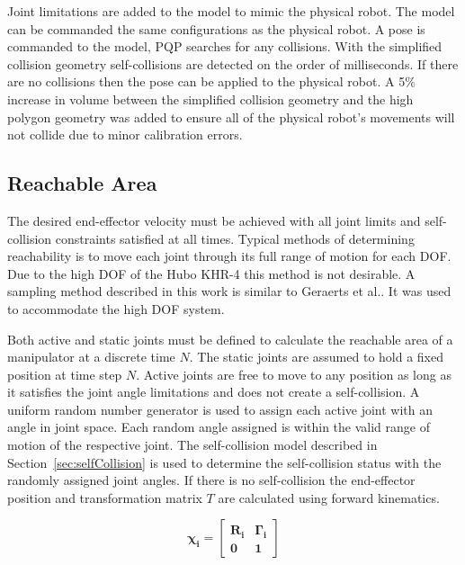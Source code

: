 Joint limitations are added to the model to mimic the physical robot.  The model can be commanded the same configurations as the physical robot.  A pose is commanded to the model, PQP searches for any collisions.  With the simplified collision geometry self-collisions are detected on the order of milliseconds.  If there are no collisions then the pose can be applied to the physical robot.  A 5\% increase in volume between the simplified collision geometry and the high polygon geometry was added to ensure all of the physical robot's movements will not collide due to minor calibration errors.


\subsection{Reachable Area}\label{sec:rarea}
The desired end-effector velocity must be achieved with all joint limits and self-collision constraints satisfied at all times. Typical methods of determining reachability is to move each joint through its full range of motion for each DOF\cite{100034,springerlink:101007}. Due to the high DOF of the Hubo KHR-4 this method is not desirable.  A sampling method described in this work is similar to Geraerts et al.\cite{1570152}.  It was used to accommodate the high DOF system.

Both active and static joints must be defined to calculate the reachable area of a manipulator at a discrete time $N$.  The static joints are assumed to hold a fixed position at time step $N$.  Active joints are free to move to any position as long as it satisfies the joint angle limitations and does not create a self-collision.  A uniform random number generator is used to assign each active joint with an angle in joint space.  Each random angle assigned is within the valid range of motion of the respective joint.  The self-collision model described in Section~\ref{sec:selfCollision} is used to determine the self-collision status with the randomly assigned joint angles.  If there is no self-collision the end-effector position and transformation matrix $T$ are calculated using forward kinematics.

\begin{equation}\label{eq:fk1}
\mathbf{
\chi_i = \begin{bmatrix} R_{i} & \Gamma_{i} \\ 0 & 1 \end{bmatrix}
}
\end{equation}


